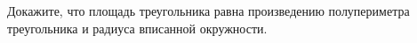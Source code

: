 \begin{ex}
	\begin{condition}
		Докажите, что площадь треугольника равна произведению полупериметра треугольника и радиуса вписанной окружности.
	\end{condition}
\end{ex}